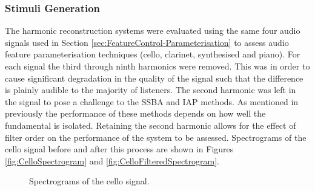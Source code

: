 		\subsubsection*{Stimuli Generation}
			The harmonic reconstruction systems were evaluated using the same four audio signals used in
			Section \ref{sec:FeatureControl-Parameterisation} to assess audio feature parameterisation
			techniques (cello, clarinet, synthesised and piano). For each signal the third through ninth
			harmonics were removed. This was in order to cause significant degradation in the quality of the
			signal such that the difference is plainly audible to the majority of listeners. The second
			harmonic was left in the signal to pose a challenge to the SSBA and IAP methods. As mentioned in
			previously the performance of these methods depends on how well the fundamental is isolated.
			Retaining the second harmonic allows for the effect of filter order on the performance of the
			system to be assessed. Spectrograms of the cello signal before and after this process are shown in
			Figures \ref{fig:CelloSpectrogram} and \ref{fig:CelloFilteredSpectrogram}. 

			\begin{figure}[h!]
				\centering
				\quad
				\caption{Spectrograms of the cello signal.}
				\label{fig:CelloSpectrograms}
			\end{figure}

